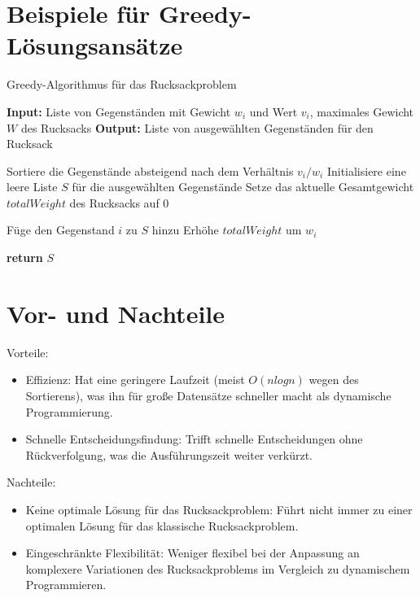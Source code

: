 \documentclass[12pt]{report}
\begin{document}
\section{Beispiele für Greedy-Lösungsansätze}
\begin{algorithm}
	\caption{Greedy-Algorithmus für das Rucksackproblem}
	\begin{algorithmic}[1]
		\State \textbf{Input:} Liste von Gegenständen mit Gewicht $w_i$ und Wert $v_i$, maximales Gewicht $W$ des Rucksacks
		\State \textbf{Output:} Liste von ausgewählten Gegenständen für den Rucksack
		
		\State Sortiere die Gegenstände absteigend nach dem Verhältnis $v_i/w_i$
		\State Initialisiere eine leere Liste $S$ für die ausgewählten Gegenstände
		\State Setze das aktuelle Gesamtgewicht $totalWeight$ des Rucksacks auf $0$
		
		\State Füge den Gegenstand $i$ zu $S$ hinzu
		\State Erhöhe $totalWeight$ um $w_i$
		\EndIf
		\EndFor
		
		\State \textbf{return} $S$
	\end{algorithmic}
\end{algorithm}

\section{Vor- und Nachteile}
Vorteile: 
\begin{itemize}
	\item Effizienz: Hat eine geringere Laufzeit (meist $O(nlogn)$ wegen des Sortierens), was ihn für große Datensätze schneller macht als dynamische Programmierung.
	\item Schnelle Entscheidungsfindung: Trifft schnelle Entscheidungen ohne Rückverfolgung, was die Ausführungszeit weiter verkürzt.
\end{itemize}

Nachteile:
\begin{itemize}
	\item Keine optimale Lösung für das Rucksackproblem: Führt nicht immer zu einer optimalen Lösung für das klassische Rucksackproblem.
	\item Eingeschränkte Flexibilität: Weniger flexibel bei der Anpassung an komplexere Variationen des Rucksackproblems im Vergleich zu dynamischem Programmieren.
\end{itemize}
\end{document}
